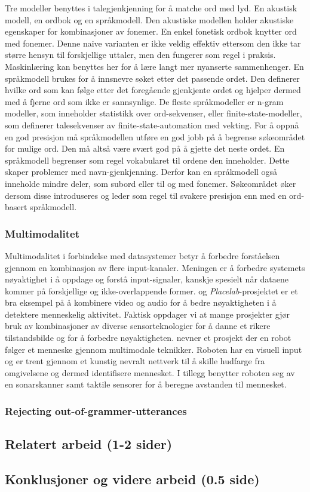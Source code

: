 Tre modeller benyttes i talegjenkjenning for å matche ord med lyd. En akustisk modell, en ordbok og en språkmodell. Den akustiske modellen holder akustiske egenskaper for kombinasjoner av fonemer. En enkel fonetisk ordbok knytter ord med fonemer. Denne naive varianten er ikke veldig effektiv ettersom den ikke tar større hensyn til forskjellige uttaler, men den fungerer som regel i praksis. Maskinlæring kan benyttes her for å lære langt mer nyanserte sammenhenger. En språkmodell brukes for å innsnevre søket etter det passende ordet. Den definerer hvilke ord som kan følge etter det foregående gjenkjente ordet og hjelper dermed med å fjerne ord som ikke er sannsynlige. De fleste språkmodeller er n-gram modeller, som inneholder statistikk over ord-sekvenser, eller finite-state-modeller, som definerer talesekvenser av finite-state-automation med vekting. For å oppnå en god presisjon må språkmodellen utføre en god jobb på å begrense søkeområdet for mulige ord. Den må altså være svært god på å gjette det neste ordet. En språkmodell begrenser som regel vokabularet til ordene den inneholder. Dette skaper problemer med navn-gjenkjenning. Derfor kan en språkmodell også inneholde mindre deler, som subord eller til og med fonemer. Søkeområdet øker dersom disse introduseres og leder som regel til svakere presisjon enn med en ord-basert språkmodell.  

\subsubsection*{Multimodalitet}

Multimodalitet i forbindelse med datasystemer betyr å forbedre forståelsen gjennom en kombinasjon av flere input-kanaler. Meningen er å forbedre systemets nøyaktighet i å oppdage og forstå input-signaler, kanskje spesielt når dataene kommer på forskjellige og ikke-overlappende former. \citet{placelab05} og \emph{Placelab}-prosjektet er et bra eksempel på å kombinere video og audio for å bedre nøyaktigheten i å detektere menneskelig aktivitet. Faktisk oppdager vi at mange prosjekter gjør bruk av kombinasjoner av diverse sensorteknologier for å danne et rikere tilstandsbilde og for å forbedre nøyaktigheten. \citet{desilva12} nevner et prosjekt der en robot følger et menneske gjennom multimodale teknikker. Roboten har en visuell input og er trent gjennom et kunstig nevralt nettverk til å skille hudfarge fra omgivelsene og dermed identifisere mennesket. I tillegg benytter roboten seg av en sonarskanner samt taktile sensorer for å beregne avstanden til mennesket.

\subsubsection*{Rejecting out-of-grammer-utterances}

\subsection{Relatert arbeid (1-2 sider)}

\subsection{Konklusjoner og videre arbeid (0.5 side)}

